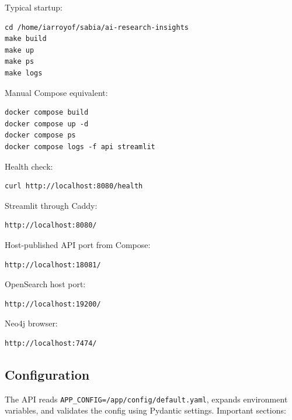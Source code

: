 \documentclass[10pt,letterpaper]{article}
\begin{document}
Typical startup:

\begin{Verbatim}[fontsize=\scriptsize,breaklines=true,breakanywhere=true]
cd /home/iarroyof/sabia/ai-research-insights
make build
make up
make ps
make logs
\end{Verbatim}

Manual Compose equivalent:

\begin{Verbatim}[fontsize=\scriptsize,breaklines=true,breakanywhere=true]
docker compose build
docker compose up -d
docker compose ps
docker compose logs -f api streamlit
\end{Verbatim}

Health check:

\begin{Verbatim}[fontsize=\scriptsize,breaklines=true,breakanywhere=true]
curl http://localhost:8080/health
\end{Verbatim}

Streamlit through Caddy:

\begin{Verbatim}[fontsize=\scriptsize,breaklines=true,breakanywhere=true]
http://localhost:8080/
\end{Verbatim}

Host-published API port from Compose:

\begin{Verbatim}[fontsize=\scriptsize,breaklines=true,breakanywhere=true]
http://localhost:18081/
\end{Verbatim}

OpenSearch host port:

\begin{Verbatim}[fontsize=\scriptsize,breaklines=true,breakanywhere=true]
http://localhost:19200/
\end{Verbatim}

Neo4j browser:

\begin{Verbatim}[fontsize=\scriptsize,breaklines=true,breakanywhere=true]
http://localhost:7474/
\end{Verbatim}

\subsection{Configuration}

The API reads \texttt{APP\_CONFIG=/app/config/default.yaml}, expands environment variables, and validates the config using Pydantic settings. Important sections:
\end{document}
